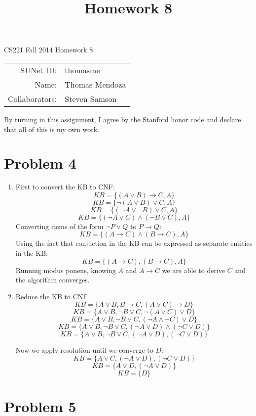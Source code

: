 \documentclass[12pt]{article}
\title{Homework 8}
\begin{document}
\begin{center}
{\Large CS221 Fall 2014 Homework 8}

\begin{tabular}{rl}
SUNet ID: & thomasme \\
Name: & Thomas Mendoza \\
Collaborators: & Steven Samson
\end{tabular}
\end{center}

By turning in this assignment, I agree by the Stanford honor code and declare
that all of this is my own work.

\section*{Problem 4}

\begin{enumerate}[label=(\alph*)]
	\item First to convert the KB to CNF:
		\[
			KB = \{(A \lor B) \to C, A\}
		\]
		\[
			KB = \{\lnot(A \lor B) \lor C, A\}
		\]
		\[
			KB = \{(\lnot A \lor \lnot B) \lor C, A\}
		\]
		\[
			KB = \{(\lnot A \lor C) \land (\lnot B \lor C), A\}
		\]
		Converting items of the form \(\lnot P \lor Q\) to \(P \to Q\):
		\[
			KB = \{(A \to C) \land (B \to C), A\}
		\]
		Using the fact that conjuction in the KB can be expressed as separate
		entities in the KB:
		\[
			KB = \{(A \to C), (B \to C), A\}
		\]
		Running modus ponens, knowing \(A\) and \(A \to C\) we are able to derive
		\(C\) and the algorithm converges.

	\item Reduce the KB to CNF
		\[
			KB = \{A \lor B, B \to C, (A \lor C) \to D\}
		\]
		\[
			KB = \{A \lor B, \lnot B \lor C, \lnot (A \lor C) \lor D\}
		\]
		\[
			KB = \{A \lor B, \lnot B \lor C, (\lnot A \land \lnot C) \lor D\}
		\]
		\[
			KB = \{A \lor B, \lnot B \lor C, (\lnot A \lor D) \land (\lnot C \lor D)\}
		\]
		\[
			KB = \{A \lor B, \lnot B \lor C, (\lnot A \lor D), (\lnot C \lor D)\}
		\]

		Now we apply resolution until we converge to \(D\):
		\[
			KB = \{A \lor C, (\lnot A \lor D), (\lnot C \lor D)\}
		\]
		\[
			KB = \{A \lor D, (\lnot A \lor D)\}
		\]
		\[
			KB = \{D\}
		\]


\end{enumerate}

\section*{Problem 5}
\end{document}
